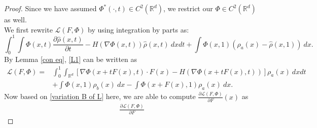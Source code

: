 \documentclass{article}
\begin{document}
\begin{proof}
   Since we have assumed $\Phi^*(\cdot, t)\in C^2(\mathbb{R}^d)$, we restrict our $\Phi\in C^2(\mathbb{R}^d)$ as well.\\
   We first rewrite $\mathcal{L}( {F}, \Phi)$ by using integration by parts as:
   \begin{equation}
     \int_0^1 \int \Phi(x,t)\frac{\partial \hat{\rho}(x,t)}{\partial t} - H(\nabla\Phi(x,t)) \hat{\rho}(x,t)~dxdt + \int \Phi(x,1)(\rho_a(x) - \hat{\rho}(x,1))~dx . \label{L1}
   \end{equation}
  By Lemma \ref{con eq}, \eqref{L1} can be written as
  \begin{align}
     \mathcal{L}( {F}, \Phi) %
     = & \int_0^1\int_{\mathbb{R}^d} [\nabla\Phi(x+t {F}(x),t)\cdot  { F }(x) - H(\nabla \Phi(x+t {F}(x),t))]\rho_a(x)~dxdt \label{variation B of L} \\
     & + \int \Phi(x,1)\rho_b(x)~dx - \int \Phi(x+ {F}(x), 1)\rho_a(x)~dx.\nonumber
  \end{align}
  Now based on \eqref{variation B of L} here, we are able to compute $\frac{\partial \mathcal{L}( {F}, \Phi)}{\partial  {F}}(x)$ as
  \begin{align}
     \frac{\partial \mathcal{L}( {F}, \Phi)}{\partial {F}} %

\end{align}
\end{proof}
\end{document}
